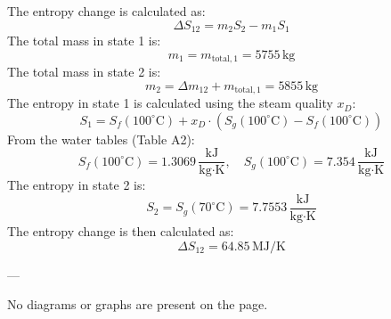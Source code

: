 The entropy change is calculated as:  
\[
\Delta S_{12} = m_2 S_2 - m_1 S_1
\]  
The total mass in state 1 is:  
\[
m_1 = m_{\text{total},1} = 5755 \, \text{kg}
\]  
The total mass in state 2 is:  
\[
m_2 = \Delta m_{12} + m_{\text{total},1} = 5855 \, \text{kg}
\]  
The entropy in state 1 is calculated using the steam quality \( x_D \):  
\[
S_1 = S_f(100^\circ\text{C}) + x_D \cdot (S_g(100^\circ\text{C}) - S_f(100^\circ\text{C}))
\]  
From the water tables (Table A2):  
\[
S_f(100^\circ\text{C}) = 1.3069 \, \frac{\text{kJ}}{\text{kg·K}}, \quad S_g(100^\circ\text{C}) = 7.354 \, \frac{\text{kJ}}{\text{kg·K}}
\]  
The entropy in state 2 is:  
\[
S_2 = S_g(70^\circ\text{C}) = 7.7553 \, \frac{\text{kJ}}{\text{kg·K}}
\]  
The entropy change is then calculated as:  
\[
\Delta S_{12} = 64.85 \, \text{MJ/K}
\]  

---

No diagrams or graphs are present on the page.